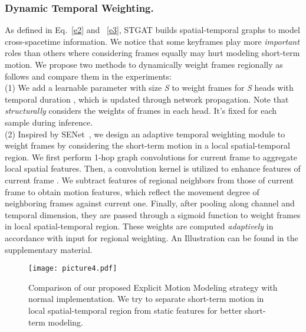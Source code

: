 \documentclass[runningheads]{llncs}
\begin{document}
\subsubsection{Dynamic Temporal Weighting.}
As defined in Eq.~\ref{e2} and ~\ref{e3}, STGAT builds spatial-temporal graphs to model cross-spacetime information. We notice that some keyframes play more \textit{important} roles than others where considering frames equally may hurt modeling short-term motion. We propose two methods to dynamically weight frames regionally as follows and compare them in the experiments:\\
(1) We add a learnable parameter  with size \textit{S} to weight frames for \textit{S} heads with temporal duration , which is updated through network propagation. Note that  \textit{structurally} considers the weights of frames in each head. It's fixed for each sample during inference.\\
(2) Inspired by SENet~\cite{hu2018squeeze}, we design an adaptive temporal weighting module to weight frames by considering the short-term motion in a local spatial-temporal region. We first perform 1-hop graph convolutions for current frame  to aggregate local spatial features. Then, a  convolution kernel is utilized to enhance features of current frame . We subtract features of regional neighbors from those of current frame to obtain motion features, which reflect the movement degree of neighboring frames against current one. Finally, after pooling along channel and temporal dimension, they are passed through a sigmoid function to weight frames in local spatial-temporal region. These weights are computed \textit{adaptively} in accordance with input for regional weighting. An Illustration can be found in the supplementary material.
\begin{figure}[t]
\centering
\texttt{[image: picture4.pdf]} 
\caption{ Comparison of our proposed Explicit Motion Modeling strategy with normal  implementation. We try to separate short-term motion in local spatial-temporal region from static features for better short-term modeling.}
\label{fig4}
\end{figure}
\end{document}

